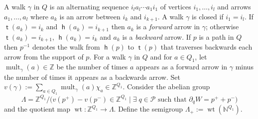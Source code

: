 \documentclass[11pt,a4paper]{amsart}
\numberwithin{equation}{section}
\theoremstyle{definition}
\theoremstyle{remark}
\newcommand{\NN}{\ensuremath{\mathbb{N}}}
\newcommand{\ZZ}{\ensuremath{\mathbb{Z}}}
\newcommand{\head}{\operatorname{\mathsf{h}}}
\newcommand{\mult}{\operatorname{mult}}
\newcommand{\tail}{\operatorname{\mathsf{t}}}
\newcommand{\wt}{\operatorname{wt}}
\begin{document}
A walk $\gamma$ in $Q$ is an alternating sequence $i_l a_l \dotsb a_1 i_{1}$ of vertices $i_1, \dotsc, i_l$ and arrows
$a_1,\dotsc, a_l$ where $a_{k}$ is an arrow between $i_{k}$ and
$i_{k+1}$.   A walk $\gamma$ is closed if $i_1 = i_l$. If $\tail(a_k) = i_{k}$ and $\head(a_k) = i_{k+1}$ then $a_k$ is
a \emph{forward} arrow in $\gamma$; otherwise $\tail(a_k) = i_{k+1}$, $\head(a_k)
= i_{k}$ and $a_k$ is a \emph{backward} arrow.  If $p$ is a path in $Q$ then $p^{-1}$ denotes the walk from $\head(p)$ to $\tail(p)$ that traverses backwards each arrow from the support of $p$. For  a walk $\gamma$ in $Q$ and for $a\in Q_1$, let $\mult_\gamma(a)\in \ZZ$ be the number of times $a$ appears as a forward arrow in $\gamma$ minus the number of times it appears as a backwards arrow. Set $v(\gamma):= \sum_{a\in Q_1} \mult_\gamma(a) \chi_a\in \ZZ^{Q_1}$.  Consider the abelian group 
  \[
  \Lambda = \ZZ^{Q_1}/\big(v(p^+) - v(p^-)\in \ZZ^{Q_1} \mid\exists\; q\in \mathscr{P} \text{ such that }\partial_qW = p^++p^-\big)
  \]
and the quotient map $\wt\colon \ZZ^{Q_1}\to \Lambda$. Define the semigroup $\Lambda_+:= \wt(\NN^{Q_1})$.
\end{document}
